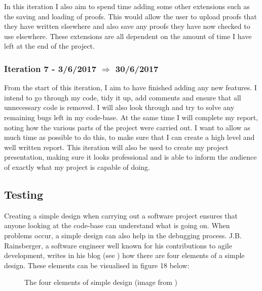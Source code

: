 In this iteration I also aim to spend time adding some other extensions such as the saving and loading of proofs. This would allow the user to upload proofs that they have written elsewhere and also save any proofs they have now checked to use elsewhere. These extensions are all dependent on the amount of time I have left at the end of the project.

\subsubsection{Iteration 7 - 3/6/2017 $\Rightarrow$ 30/6/2017}

From the start of this iteration, I aim to have finished adding any new features. I intend to go through my code, tidy it up, add comments and ensure that all unnecessary code is removed. I will also look through and try to solve any remaining bugs left in my code-base. At the same time I will complete my report, noting how the various parts of the project were carried out. I want to allow as much time as possible to do this, to make sure that I can create a high level and well written report. This iteration will also be used to create my project presentation, making sure it looks professional and is able to inform the audience of exactly what my project is capable of doing.

\subsection{Testing \label{testing}}
Creating a simple design when carrying out a software project ensures that anyone looking at the code-base can understand what is going on. When problems occur, a simple design can also help in the debugging process. J.B. Rainsberger, a software engineer well known for his contributions to agile development, writes in his blog (see \cite{jBrains}) how there are four elements of a simple design. These elements can be visualised in figure 18 below:

\begin{figure}[!ht]
	\centering
	\caption{The four elements of simple design (image from \cite{SED})}
\end{figure}

